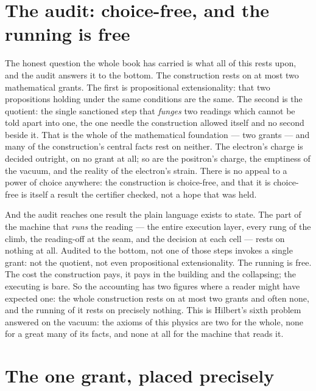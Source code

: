 \section{The audit: choice-free, and the running is free}
\label{se:the-audit-choice-free}

The honest question the whole book has carried is what all of this rests upon, and the audit answers it to
the bottom. The construction rests on at most two mathematical grants. The first is propositional
extensionality: that two propositions holding under the same conditions are the same. The second is the
quotient: the single sanctioned step that \emph{funges} two readings which cannot be told apart into one,
the one needle the construction allowed itself and no second beside it. That is the whole of the
mathematical foundation --- two grants --- and many of the construction's central facts rest on neither. The
electron's charge is decided outright, on no grant at all; so are the positron's charge, the emptiness of
the vacuum, and the reality of the electron's strain. There is no appeal to a power of choice anywhere: the
construction is choice-free, and that it is choice-free is itself a result the certifier checked, not a hope
that was held.

And the audit reaches one result the plain language exists to state. The part of the machine that
\emph{runs} the reading --- the entire execution layer, every rung of the climb, the reading-off at the
seam, and the decision at each cell --- rests on nothing at all. Audited to the bottom, not one of those
steps invokes a single grant: not the quotient, not even propositional extensionality. The running is free.
The cost the construction pays, it pays in the building and the collapsing; the executing is bare. So the
accounting has two figures where a reader might have expected one: the whole construction rests on at most
two grants and often none, and the running of it rests on precisely nothing. This is Hilbert's sixth problem
answered on the vacuum: the axioms of this physics are two for the whole, none for a great many of its
facts, and none at all for the machine that reads it.

\section{The one grant, placed precisely}
\label{se:the-one-grant-placed}

